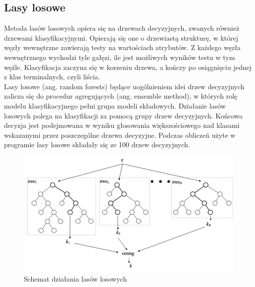 \documentclass{article}
\begin{document}
\subsection{Lasy losowe}
Metoda lasów losowych opiera się na drzewach decyzyjnych, zwanych również drzewami klasyfikacyjnymi. Opierają się one o drzewiastą strukturę, w której węzły wewnętrzne zawierają testy na wartościach atrybutów. Z każdego węzła wewnętrznego wychodzi tyle gałęzi, ile jest możliwych wyników testu w tym węźle.  Klasyfikacja zaczyna się w korzeniu drzewa, a kończy po osiągnięciu jednej z klas terminalnych, czyli liścia.\\ 
Lasy losowe (ang. random forests) będące  uogólnieniem idei drzew decyzyjnych zalicza się do procedur agregujących (ang. ensemble method), w których rolę modelu klasyfikacyjnego pełni grupa modeli składowych. Działanie lasów losowych polega na klasyfikacji za pomocą grupy drzew decyzyjnych. Końcowa decyzja jest podejmowana w wyniku  głosowania większościowego  nad klasami wskazanymi przez poszczególne drzewa decyzyjne. Podczas obliczeń użyte w programie lasy losowe składały się ze 100 drzew decyzyjnych.
\begin{figure}[htp]
	\centering
	\includegraphics[width=1\textwidth]{Figures/rf.jpg}
	\caption{Schemat działania lasów losowych }
\end{figure}
\end{document}
